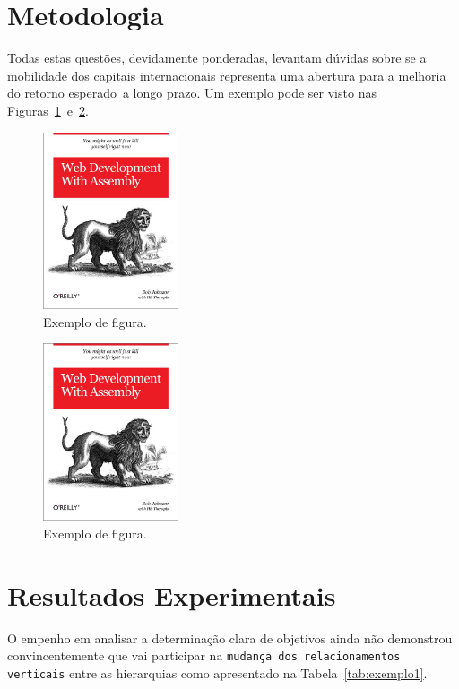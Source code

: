 \documentclass{article}
\begin{document}
\section{Metodologia}

Todas estas questões, devidamente ponderadas, levantam dúvidas sobre se a mobilidade dos capitais internacionais representa uma abertura para a melhoria do retorno esperado~a longo prazo. Um exemplo pode ser visto nas Figuras~\ref{fig:exemplo1}~e~\ref{fig:exemplo2}.

\begin{figure}[h]
    \centering
    \includegraphics[width=4cm]{exemplo.jpg}
    \caption{Exemplo de figura.}
    \label{fig:exemplo1}
\end{figure}

\begin{figure}[h]
    \centering
    \includegraphics[width=4cm]{exemplo.jpg}
    \caption{Exemplo de figura.}
    \label{fig:exemplo2}
\end{figure}


\section{Resultados Experimentais}

O empenho em analisar a determinação clara de objetivos ainda não demonstrou convincentemente que vai participar na \texttt{mudança dos relacionamentos verticais} entre as hierarquias como apresentado na Tabela~\ref{tab:exemplo1}.
\end{document}
